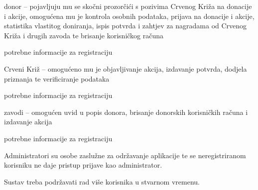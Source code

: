 		\begin{packed_item}
			\item donor –  pojavljuju mu se skočni prozorčići s pozivima Crvenog Križa na donacije i akcije, omogućena mu je kontrola osobnih 							podataka, prijava na donacije i akcije, statistika vlastitog doniranja, ispis potvrda i zahtjev za nagradama od Crvenog Križa i drugih zavoda te 					brisanje korisničkog računa
				\begin{packed_item}
					\item potrebne informacije za registraciju
				\end{packed_item}
			\item Crveni Križ – omogućeno mu je objavljivanje akcija, izdavanje potvrda, dodjela priznanja te verificiranje podataka
				\begin{packed_item}
					\item potrebne informacije za registraciju
				\end{packed_item}
			\item zavodi – omogućen uvid u popis donora, brisanje donorskih korisničkih računa i izdavanje akcija
				\begin{packed_item}
					\item potrebne informacije za registraciju
				\end{packed_item}
		\end{packed_item}
		
		Administratori su osobe zaslužne za održavanje aplikacije te se neregistriranom korisniku ne daje pristup prijave kao administrator. 

		Sustav treba podržavati rad više korisnika u stvarnom vremenu.

